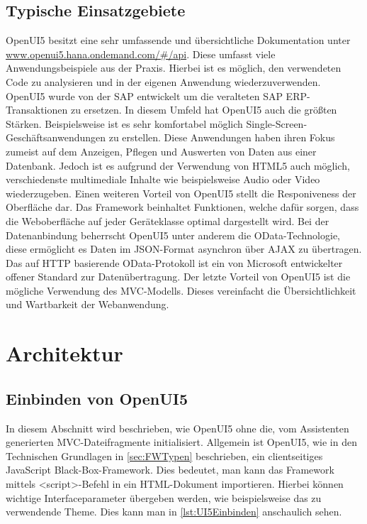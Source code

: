 \subsection{Typische Einsatzgebiete}

OpenUI5 besitzt eine sehr umfassende und übersichtliche Dokumentation unter \url{www.openui5.hana.ondemand.com/#/api}. Diese umfasst viele Anwendungsbeispiele aus der Praxis. Hierbei ist es möglich, den verwendeten Code zu analysieren und in der eigenen Anwendung wiederzuverwenden. OpenUI5 wurde von der SAP entwickelt um die veralteten SAP ERP-Transaktionen zu ersetzen. In diesem Umfeld hat OpenUI5 auch die größten Stärken. Beispielsweise ist es sehr komfortabel möglich Single-Screen-Geschäftsanwendungen zu erstellen. Diese Anwendungen haben ihren Fokus zumeist auf dem Anzeigen, Pflegen und Auswerten von Daten aus einer Datenbank. Jedoch ist es aufgrund der Verwendung von HTML5 auch möglich, verschiedenste multimediale Inhalte wie beispielsweise Audio oder Video wiederzugeben. Einen weiteren Vorteil von OpenUI5 stellt die Responiveness der Oberfläche dar. Das Framework beinhaltet Funktionen, welche dafür sorgen, dass die Weboberfläche auf jeder Geräteklasse optimal dargestellt wird. Bei der Datenanbindung beherrscht OpenUI5 unter anderem die OData-Technologie, diese ermöglicht es Daten im JSON-Format asynchron über AJAX zu übertragen. Das auf HTTP basierende OData-Protokoll ist ein von Microsoft entwickelter offener Standard zur Datenübertragung. Der letzte Vorteil von OpenUI5 ist die mögliche Verwendung des MVC-Modells. Dieses vereinfacht die Übersichtlichkeit und Wartbarkeit der Webanwendung.\autocites[vgl.][26\psqq]{Magnucki2017}


\section{Architektur}

\subsection{Einbinden von OpenUI5}\label{sec_oGrund}

In diesem Abschnitt wird beschrieben, wie OpenUI5 ohne die, vom Assistenten generierten MVC-Dateifragmente initialisiert. Allgemein ist OpenUI5, wie in den Technischen Grundlagen in \autoref{sec:FWTypen} beschrieben, ein clientseitiges JavaScript Black-Box-Framework. Dies bedeutet, man kann das Framework mittels <script>-Befehl in ein HTML-Dokument importieren. Hierbei können wichtige Interfaceparameter übergeben werden, wie beispielsweise das zu verwendende Theme. Dies kann man in \autoref{lst:UI5Einbinden} anschaulich sehen.

